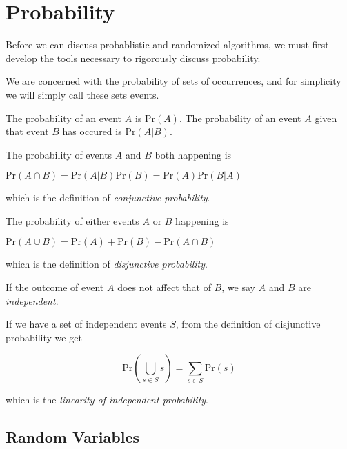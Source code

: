 \renewcommand{\Pr}{\text{Pr}}
\newcommand{\Var}{\text{Var}}

\chapter{Probability}

Before we can discuss probablistic and randomized algorithms, we must
first develop the tools necessary to rigorously discuss probability.

We are concerned with the probability of sets of occurrences, and for
simplicity we will simply call these sets events.

The probability of an event $A$ is $\Pr(A)$.  The probability of an
event $A$ given that event $B$ has occured is $\Pr(A | B)$.

The probability of events $A$ and $B$ both happening is

\begin{center}
\begin{math}
\Pr(A \cap B)
= \Pr(A|B)\Pr(B) = \Pr(A)\Pr(B|A)
\end{math}
\end{center}

which is the definition of \emph{conjunctive probability}.

The probability of either events $A$ or $B$ happening is

\begin{center}
\begin{math}
  \Pr(A \cup B)
  = \Pr(A) + \Pr(B) - \Pr(A \cap B)
\end{math}
\end{center}

which is the definition of \emph{disjunctive probability}.

If the outcome of event $A$ does not affect that of $B$, we say $A$
and $B$ are \emph{independent}.

If we have a set of independent events $S$, from the definition of
disjunctive probability we get

\begin{displaymath}
  \Pr \left( \bigcup_{s \in S} s \right) = \sum_{s \in S} \Pr(s)
\end{displaymath}

which is the \emph{linearity of independent probability}.

\section{Random Variables}

